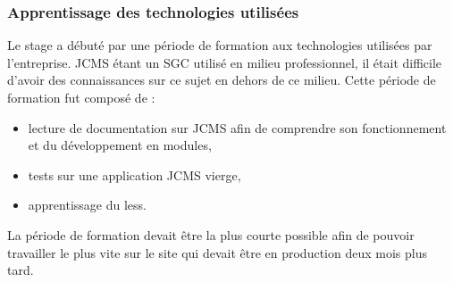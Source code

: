 \documentclass[12pt,a4paper]{article}
\begin{document}
\subsubsection{Apprentissage des technologies utilisées}
Le stage a débuté par une période de formation aux technologies utilisées par l'entreprise. JCMS étant un SGC utilisé en milieu professionnel, il était difficile d'avoir des connaissances sur ce sujet en dehors de ce milieu. Cette période de formation fut composé de :
\begin{itemize}
\item lecture de documentation sur JCMS afin de comprendre son fonctionnement et du développement en modules,
\item tests sur une application JCMS vierge,
\item apprentissage du less.
\end{itemize} 
La période de formation devait être la plus courte possible afin de pouvoir travailler le plus vite sur le site qui devait être en production deux mois plus tard. \par
\end{document}
